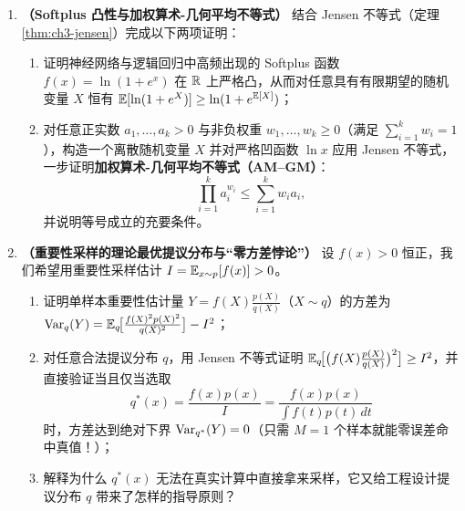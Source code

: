 \begin{enumerate}[label=\textbf{3.\arabic*}, leftmargin=2.4em, resume]
  \item \textbf{（Softplus 凸性与加权算术-几何平均不等式）} 结合 Jensen 不等式（定理 \ref{thm:ch3-jensen}）完成以下两项证明：
  \begin{enumerate}[label=(\arabic*), leftmargin=1.8em]
    \item 证明神经网络与逻辑回归中高频出现的 Softplus 函数 $f(x) = \ln(1 + e^x)$ 在 $\mathbb{R}$ 上严格凸，从而对任意具有有限期望的随机变量 $X$ 恒有 $\mathbb{E}[\ln(1 + e^X)] \ge \ln(1 + e^{\mathbb{E}[X]})$；
    \item 对任意正实数 $a_1, \dots, a_k > 0$ 与非负权重 $w_1, \dots, w_k \ge 0$（满足 $\sum_{i=1}^k w_i = 1$），构造一个离散随机变量 $X$ 并对严格凹函数 $\ln x$ 应用 Jensen 不等式，一步证明\textbf{加权算术-几何平均不等式（AM--GM）}：
    \[
      \prod_{i=1}^k a_i^{w_i} \le \sum_{i=1}^k w_i a_i,
    \]
    并说明等号成立的充要条件。
  \end{enumerate}

  \item \textbf{（重要性采样的理论最优提议分布与“零方差悖论”）} 设 $f(x) > 0$ 恒正，我们希望用重要性采样估计 $I = \mathbb{E}_{x\sim p}[f(x)] > 0$。
  \begin{enumerate}[label=(\arabic*), leftmargin=1.8em]
    \item 证明单样本重要性估计量 $Y = f(X)\frac{p(X)}{q(X)}$（$X \sim q$）的方差为 $\operatorname{Var}_q(Y) = \mathbb{E}_q\!\bigl[\frac{f(X)^2 p(X)^2}{q(X)^2}\bigr] - I^2$；
    \item 对任意合法提议分布 $q$，用 Jensen 不等式证明 $\mathbb{E}_q\!\bigl[\bigl(f(X)\frac{p(X)}{q(X)}\bigr)^2\bigr] \ge I^2$，并直接验证当且仅当选取
    \[
      q^*(x) = \frac{f(x) p(x)}{I} = \frac{f(x) p(x)}{\int f(t) p(t)\,dt}
    \]
    时，方差达到绝对下界 $\operatorname{Var}_{q^*}(Y) = 0$（只需 $M = 1$ 个样本就能零误差命中真值！）；
    \item 解释为什么 $q^*(x)$ 无法在真实计算中直接拿来采样，它又给工程设计提议分布 $q$ 带来了怎样的指导原则？
  \end{enumerate}
\end{enumerate}


